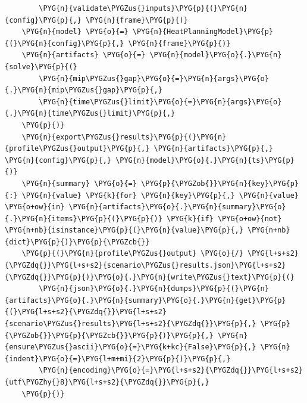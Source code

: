 \begin{Verbatim}
        \PYG{n}{validate\PYGZus{}inputs}\PYG{p}{(}\PYG{n}{config}\PYG{p}{,} \PYG{n}{frame}\PYG{p}{)}
    \PYG{n}{model} \PYG{o}{=} \PYG{n}{HeatPlanningModel}\PYG{p}{(}\PYG{n}{config}\PYG{p}{,} \PYG{n}{frame}\PYG{p}{)}
    \PYG{n}{artifacts} \PYG{o}{=} \PYG{n}{model}\PYG{o}{.}\PYG{n}{solve}\PYG{p}{(}
        \PYG{n}{mip\PYGZus{}gap}\PYG{o}{=}\PYG{n}{args}\PYG{o}{.}\PYG{n}{mip\PYGZus{}gap}\PYG{p}{,}
        \PYG{n}{time\PYGZus{}limit}\PYG{o}{=}\PYG{n}{args}\PYG{o}{.}\PYG{n}{time\PYGZus{}limit}\PYG{p}{,}
    \PYG{p}{)}
    \PYG{n}{export\PYGZus{}results}\PYG{p}{(}\PYG{n}{profile\PYGZus{}output}\PYG{p}{,} \PYG{n}{artifacts}\PYG{p}{,} \PYG{n}{config}\PYG{p}{,} \PYG{n}{model}\PYG{o}{.}\PYG{n}{ts}\PYG{p}{)}
    \PYG{n}{summary} \PYG{o}{=} \PYG{p}{\PYGZob{}}\PYG{n}{key}\PYG{p}{:} \PYG{n}{value} \PYG{k}{for} \PYG{n}{key}\PYG{p}{,} \PYG{n}{value} \PYG{o+ow}{in} \PYG{n}{artifacts}\PYG{o}{.}\PYG{n}{summary}\PYG{o}{.}\PYG{n}{items}\PYG{p}{(}\PYG{p}{)} \PYG{k}{if} \PYG{o+ow}{not} \PYG{n+nb}{isinstance}\PYG{p}{(}\PYG{n}{value}\PYG{p}{,} \PYG{n+nb}{dict}\PYG{p}{)}\PYG{p}{\PYGZcb{}}
    \PYG{p}{(}\PYG{n}{profile\PYGZus{}output} \PYG{o}{/} \PYG{l+s+s2}{\PYGZdq{}}\PYG{l+s+s2}{scenario\PYGZus{}results.json}\PYG{l+s+s2}{\PYGZdq{}}\PYG{p}{)}\PYG{o}{.}\PYG{n}{write\PYGZus{}text}\PYG{p}{(}
        \PYG{n}{json}\PYG{o}{.}\PYG{n}{dumps}\PYG{p}{(}\PYG{n}{artifacts}\PYG{o}{.}\PYG{n}{summary}\PYG{o}{.}\PYG{n}{get}\PYG{p}{(}\PYG{l+s+s2}{\PYGZdq{}}\PYG{l+s+s2}{scenario\PYGZus{}results}\PYG{l+s+s2}{\PYGZdq{}}\PYG{p}{,} \PYG{p}{\PYGZob{}}\PYG{p}{\PYGZcb{}}\PYG{p}{)}\PYG{p}{,} \PYG{n}{ensure\PYGZus{}ascii}\PYG{o}{=}\PYG{k+kc}{False}\PYG{p}{,} \PYG{n}{indent}\PYG{o}{=}\PYG{l+m+mi}{2}\PYG{p}{)}\PYG{p}{,}
        \PYG{n}{encoding}\PYG{o}{=}\PYG{l+s+s2}{\PYGZdq{}}\PYG{l+s+s2}{utf\PYGZhy{}8}\PYG{l+s+s2}{\PYGZdq{}}\PYG{p}{,}
    \PYG{p}{)}
\end{Verbatim}
